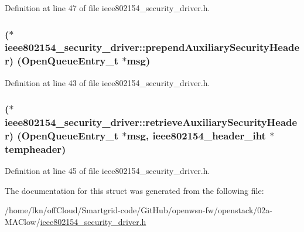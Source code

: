 Definition at line 47 of file ieee802154\+\_\+security\+\_\+driver.\+h.

\subsubsection[{\texorpdfstring{prepend\+Auxiliary\+Security\+Header}{prependAuxiliarySecurityHeader}}]{($\ast$  ieee802154\+\_\+security\+\_\+driver\+::prepend\+Auxiliary\+Security\+Header) ({\bf Open\+Queue\+Entry\+\_\+t} $\ast$msg)}\hypertarget{structieee802154__security__driver_a85cc01dd18837b7e3d78832cebf5db66}{}\label{structieee802154__security__driver_a85cc01dd18837b7e3d78832cebf5db66}


Definition at line 43 of file ieee802154\+\_\+security\+\_\+driver.\+h.

\subsubsection[{\texorpdfstring{retrieve\+Auxiliary\+Security\+Header}{retrieveAuxiliarySecurityHeader}}]{($\ast$  ieee802154\+\_\+security\+\_\+driver\+::retrieve\+Auxiliary\+Security\+Header) ({\bf Open\+Queue\+Entry\+\_\+t} $\ast$msg, {\bf ieee802154\+\_\+header\+\_\+iht} $\ast$tempheader)}\hypertarget{structieee802154__security__driver_ae2f969f147c6871c1ddac56374fc9d9a}{}\label{structieee802154__security__driver_ae2f969f147c6871c1ddac56374fc9d9a}


Definition at line 45 of file ieee802154\+\_\+security\+\_\+driver.\+h.



The documentation for this struct was generated from the following file\+:\begin{DoxyCompactItemize}
\item 
/home/lkn/off\+Cloud/\+Smartgrid-\/code/\+Git\+Hub/openwsn-\/fw/openstack/02a-\/\+M\+A\+Clow/\hyperlink{ieee802154__security__driver_8h}{ieee802154\+\_\+security\+\_\+driver.\+h}\end{DoxyCompactItemize}
